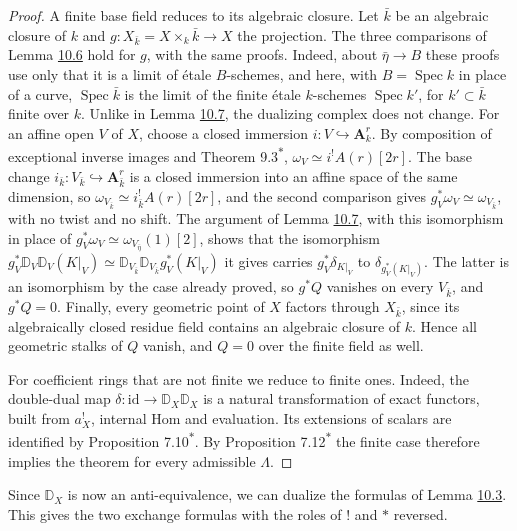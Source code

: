 \documentclass[11pt]{article}
\newcommand{\bpout}[1]{#1\textsuperscript{\hyperlink{bp-outside}{\ensuremath{\ast}}}}
\begin{document}
\begin{proof}[{Proof}]
A finite base field reduces to its algebraic closure. Let \(\bar k\) be an algebraic closure of \(k\) and \(g:X_{\bar k}=X\times_k\bar k\to X\) the projection. The three comparisons of Lemma \hyperref[bp19]{10.6} hold for \(g\), with the same proofs. Indeed, about \(\bar\eta\to B\) these proofs use only that it is a limit of étale \(B\)-schemes, and here, with \(B=\operatorname{Spec}k\) in place of a curve, \(\operatorname{Spec}\bar k\) is the limit of the finite étale \(k\)-schemes \(\operatorname{Spec}k'\), for \(k'\subset\bar k\) finite over \(k\). Unlike in Lemma \hyperref[bp22]{10.7}, the dualizing complex does not change. For an affine open \(V\) of \(X\), choose a closed immersion \(i:V\hookrightarrow\mathbf A^r_k\). By composition of exceptional inverse images and Theorem \bpout{9.3}, \(\omega_V\simeq i^!A(r)[2r]\). The base change \(i_{\bar k}:V_{\bar k}\hookrightarrow\mathbf A^r_{\bar k}\) is a closed immersion into an affine space of the same dimension, so \(\omega_{V_{\bar k}}\simeq i_{\bar k}^!A(r)[2r]\), and the second comparison gives \(g_V^*\omega_V\simeq\omega_{V_{\bar k}}\), with no twist and no shift. The argument of Lemma \hyperref[bp22]{10.7}, with this isomorphism in place of \(g_V^*\omega_V\simeq\omega_{V_{\bar\eta}}(1)[2]\), shows that the isomorphism \(g_V^*\mathbb D_V\mathbb D_V(K|_V)\simeq\mathbb D_{V_{\bar k}}\mathbb D_{V_{\bar k}}g_V^*(K|_V)\) it gives carries \(g_V^*\delta_{K|_V}\) to \(\delta_{g_V^*(K|_V)}\). The latter is an isomorphism by the case already proved, so \(g^*Q\) vanishes on every \(V_{\bar k}\), and \(g^*Q=0\). Finally, every geometric point of \(X\) factors through \(X_{\bar k}\), since its algebraically closed residue field contains an algebraic closure of \(k\). Hence all geometric stalks of \(Q\) vanish, and \(Q=0\) over the finite field as well.

For coefficient rings that are not finite we reduce to finite ones. Indeed, the double-dual map \(\delta:\mathrm{id}\to\mathbb D_X\mathbb D_X\) is a natural transformation of exact functors, built from \(a_X^!\), internal Hom and evaluation. Its extensions of scalars are identified by Proposition \bpout{7.10}. By Proposition \bpout{7.12} the finite case therefore implies the theorem for every admissible \(\Lambda\).
\end{proof}

\label{bp27}%
Since \(\mathbb D_X\) is now an anti-equivalence, we can dualize the formulas of Lemma \hyperref[bp10]{10.3}. This gives the two exchange formulas with the roles of \(!\) and \(*\) reversed.
\end{document}
